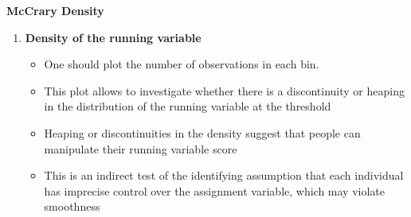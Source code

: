 \documentclass[notes=show]{beamer}
\begin{document}
\begin{frame}[plain]

			\begin{figure}
	\end{figure}

\end{frame}

\begin{frame}[plain]
	\begin{center}
	\textbf{McCrary Density}
	\end{center}
	
	\begin{enumerate}\addtocounter{enumi}{2}
	\item \textbf{Density of the running variable}
		\begin{itemize}
		\item One should plot the number of observations in each bin.
		\item This plot allows to investigate whether there is a discontinuity or heaping in the distribution of the running variable at the threshold
		\item Heaping or discontinuities in the density suggest that people can manipulate their running variable score
		\item This is an indirect test of the identifying assumption that each individual has imprecise control over the assignment variable, which may violate smoothness
		\end{itemize}
	\end{enumerate}
\end{frame}
\end{document}
